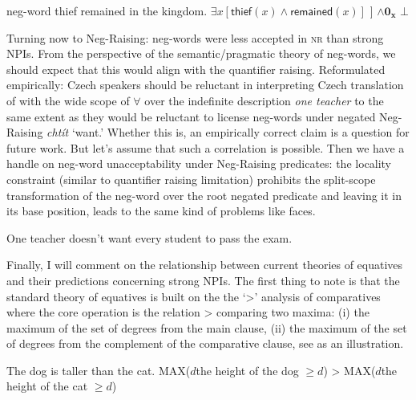 \ea\label{ex-15} neg-word thief remained in the kingdom. \ea {[}\(\exists x[\mathsf{thief}(x) \wedge \mathsf{remained}(x)]\) {]} \(\wedge \mathbf{0_x}\) \hfill \(\bot\)\z\z

Turning now to Neg-Raising: neg-words were less accepted in \textsc{nr} than strong NPIs. From the perspective of the semantic/pragmatic theory of neg-words, we should expect that this would align with the quantifier raising. Reformulated empirically: Czech speakers should be reluctant in interpreting Czech translation of  with the wide scope of $\forall$ over the indefinite description \textit{one teacher} to the same extent as they would be reluctant to license neg-words under negated Neg-Raising \textit{chtít} `want.' Whether this is, an empirically correct claim is a question for future work. But let's assume that such a correlation is possible. Then we have a handle on neg-word unacceptability under Neg-Raising predicates: the locality constraint (similar to quantifier raising limitation) prohibits the split-scope transformation of the neg-word over the root negated predicate and leaving it in its base position, leads to the same kind of problems like  faces.

\ea\label{ex-16} One teacher doesn't want every student to pass the exam.
\z

Finally, I will comment on the relationship between current theories of equatives and their predictions concerning strong NPIs. The first thing to note is that the standard theory of equatives is built on the the `>' analysis of comparatives \citep{beck_comparison_nodate,stechow1984comparing} where the core operation is the relation > comparing two maxima: (i) the maximum of the set of degrees from the main clause, (ii) the maximum of the set of degrees from the complement of the comparative clause, see  as an illustration. 


\ea\label{ex-17} The dog is taller than the cat. \ea MAX({$d$\vert the height of the dog $\geq d$}) > MAX({$d$\vert the height of the cat $\geq d$})\z\z

